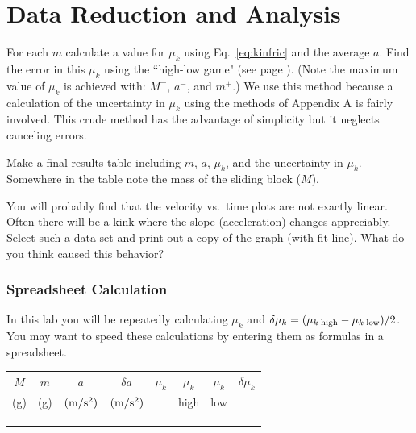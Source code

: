 \section*{Data Reduction and Analysis}

For each $m$ calculate a value for $\mu_{k}$ using Eq.~\ref{eq:kinfric} and the average $a$.
Find the error in this $\mu_{k}$ using the ``high-low game" (see page \pageref{par:high.low.game}). 
(Note the maximum value of $\mu_{k}$ is achieved with:
$M^-$, $a^-$, and $m^+$.)
We use this method because a calculation of the uncertainty in
$\mu_{k}$ using the methods of Appendix A is fairly involved.  
This  crude method has
the advantage of simplicity but it
neglects canceling errors.

Make a final results table including $m$, $a$, $\mu_{k}$, and
the uncertainty in $\mu_{k}$.  
Somewhere in the table note the mass of the sliding block ($M$).

You will probably find that the velocity vs.\ time plots are not exactly
linear.  Often there will be a kink where the slope (acceleration)
changes appreciably.  Select such a data set and print out a copy of 
the graph (with fit line).  What do you think caused this behavior?

\subsubsection*{Spreadsheet Calculation}
In this lab you will be repeatedly calculating $\mu_k$ and $\delta \mu_k = (\mu_{k\; \rm high} -\mu_{k\; \rm low})/2$.
You may want to speed these calculations by  entering them as formulas in a spreadsheet.

\begin{center}
\begin{tabular}{|c|c|c|c|c|c|c|c|}
\hline
$M$ & $m$ & $a$              & $\delta a$      & $\mu_{k}$ & $\mu_{k}$ & $\mu_{k}$ & $\delta \mu_{k}$ \\
 (g)& (g) &  ${\rm (m/s^2)}$ & ${\rm (m/s^2)}$ &           & high      &  low      &  \\
\hline
 \phantom{10000}& \phantom{10000}   &  \phantom{10000}& \phantom{10000} & \phantom{10000} &  \phantom{10000}& \phantom{10000} &  \phantom{10000} \\
\hline
  &   &  &  &  &  &  &      \\ \hline
  &   &  &  &  &  &  &      \\ \hline
\end{tabular}
\end{center}

